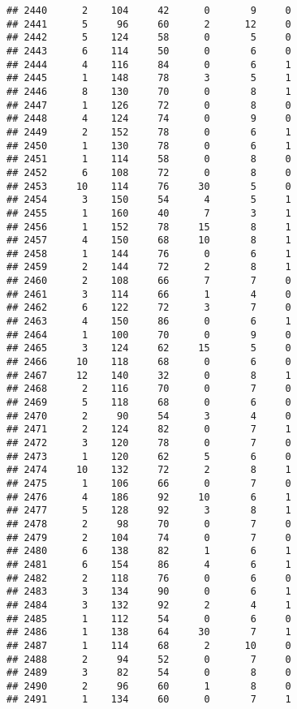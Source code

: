 \documentclass[
]{article}
\begin{document}
\begin{verbatim}
## 2440      2    104     42      0       9     0
## 2441      5     96     60      2      12     0
## 2442      5    124     58      0       5     0
## 2443      6    114     50      0       6     0
## 2444      4    116     84      0       6     1
## 2445      1    148     78      3       5     1
## 2446      8    130     70      0       8     1
## 2447      1    126     72      0       8     0
## 2448      4    124     74      0       9     0
## 2449      2    152     78      0       6     1
## 2450      1    130     78      0       6     1
## 2451      1    114     58      0       8     0
## 2452      6    108     72      0       8     0
## 2453     10    114     76     30       5     0
## 2454      3    150     54      4       5     1
## 2455      1    160     40      7       3     1
## 2456      1    152     78     15       8     1
## 2457      4    150     68     10       8     1
## 2458      1    144     76      0       6     1
## 2459      2    144     72      2       8     1
## 2460      2    108     66      7       7     0
## 2461      3    114     66      1       4     0
## 2462      6    122     72      3       7     0
## 2463      4    150     86      0       6     1
## 2464      1    100     70      0       9     0
## 2465      3    124     62     15       5     0
## 2466     10    118     68      0       6     0
## 2467     12    140     32      0       8     1
## 2468      2    116     70      0       7     0
## 2469      5    118     68      0       6     0
## 2470      2     90     54      3       4     0
## 2471      2    124     82      0       7     1
## 2472      3    120     78      0       7     0
## 2473      1    120     62      5       6     0
## 2474     10    132     72      2       8     1
## 2475      1    106     66      0       7     0
## 2476      4    186     92     10       6     1
## 2477      5    128     92      3       8     1
## 2478      2     98     70      0       7     0
## 2479      2    104     74      0       7     0
## 2480      6    138     82      1       6     1
## 2481      6    154     86      4       6     1
## 2482      2    118     76      0       6     0
## 2483      3    134     90      0       6     1
## 2484      3    132     92      2       4     1
## 2485      1    112     54      0       6     0
## 2486      1    138     64     30       7     1
## 2487      1    114     68      2      10     0
## 2488      2     94     52      0       7     0
## 2489      3     82     54      0       8     0
## 2490      2     96     60      1       8     0
## 2491      1    134     60      0       7     1

\end{verbatim}
\end{document}
